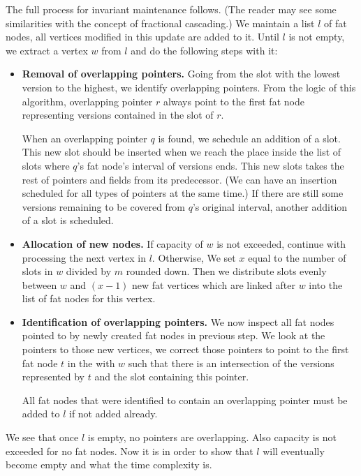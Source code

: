 The full process for invariant maintenance follows. (The reader may see some similarities with the concept of fractional cascading.) We maintain a list $l$ of fat nodes, all vertices modified in this update are added to it. Until $l$ is not empty, we extract a vertex $w$ from $l$ and do the following steps with it:

\begin{itemize}
\item {\bf Removal of overlapping pointers.} Going from the slot with the lowest version to the highest, we identify overlapping pointers. From the logic of this algorithm, overlapping pointer $r$ always point to the first fat node representing versions contained in the slot of $r$. 

When an overlapping pointer $q$ is found, we schedule an addition of a slot. This new slot should be inserted when we reach the place inside the list of slots where $q$'s fat node's interval of versions ends. This new slots takes the rest of pointers and fields from its predecessor. (We can have an insertion scheduled for all types of pointers at the same time.) If there are still some versions remaining to be covered from $q$'s original interval, another addition of a slot is scheduled.

\item {\bf Allocation of new nodes.} If capacity of $w$ is not exceeded, continue with processing the next vertex in $l$. Otherwise, We set $x$ equal to the number of slots in $w$ divided by $m$ rounded down. Then we distribute slots evenly between $w$ and $(x-1)$ new fat vertices which are linked after $w$ into the list of fat nodes for this vertex.

\item {\bf Identification of overlapping pointers.} We now inspect all fat nodes pointed to by newly created fat nodes in previous step. We look at the pointers to those new vertices, we correct those pointers to point to the first fat node $t$ in the with $w$ such that there is an intersection of the versions represented by $t$ and the slot containing this pointer.

All fat nodes that were identified to contain an overlapping pointer must be added to $l$ if not added already.
\end{itemize}



We see that once $l$ is empty, no pointers are overlapping. Also capacity is not exceeded for no fat nodes. Now it is in order to show that $l$ will eventually become empty and what the time complexity is.

